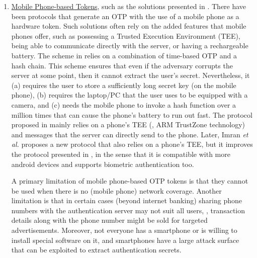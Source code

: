 \begin{enumerate}




%
\item \underline{Mobile Phone-based Tokens}, such as the solutions presented in \cite{SARA22,KoganMB17,KonothFFARB20}. There have been protocols that generate an OTP with the use of a mobile phone as a hardware token. Such solutions often rely on the added features that mobile phones offer, such as possessing a Trusted Execution Environment (TEE), being able to communicate directly with the server, or having a rechargeable battery. The scheme in \cite{KoganMB17} relies on a combination of time-based OTP and a hash chain. This scheme ensures that even if the adversary corrupts the server at some point, then it cannot extract the user's secret. Nevertheless, it  (a) requires the user to store a sufficiently long secret key (on the mobile phone), (b) requires the laptop/PC that the user uses to be equipped with a camera, and (c) needs the mobile phone to invoke a hash function over a million times that can cause the phone's battery to run out fast. The protocol proposed in \cite{KonothFFARB20} mainly relies on a phone's TEE (\ie,  ARM TrustZone technology) and messages that the server can directly send to the phone. Later,  Imran \textit{et al.} \cite{SARA22} proposes a new protocol that also relies on a phone's TEE, but it improves the protocol presented in \cite{KonothFFARB20}, in the sense that it is compatible with more android devices and supports biometric authentication too. 

A primary limitation of mobile phone-based OTP tokens is that they cannot be used when there is no (mobile phone) network coverage. Another limitation is that in certain cases (beyond internet banking) sharing phone numbers with the authentication server may not suit all users, \eg, transaction details along with the phone number might be sold for targeted advertisements. Moreover, not everyone has a smartphone or is willing to install special software on it, and smartphones have a large attack surface that can be exploited to extract authentication secrets.

%
\end{enumerate}




%







